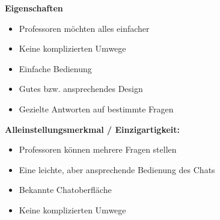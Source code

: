 \textbf{Eigenschaften}
\begin{itemize}
    \item Professoren möchten alles einfacher
    \item Keine komplizierten Umwege
    \item Einfache Bedienung
    \item Gutes bzw. ansprechendes Design
    \item Gezielte Antworten auf bestimmte Fragen
\end{itemize}
\medskip

\textbf{Alleinstellungsmerkmal / Einzigartigkeit:}
\begin{itemize}
    \item Professoren können mehrere Fragen stellen
    \item Eine leichte, aber ansprechende Bedienung des Chats
    \item Bekannte Chatoberfläche
    \item Keine komplizierten Umwege 
\end{itemize}



